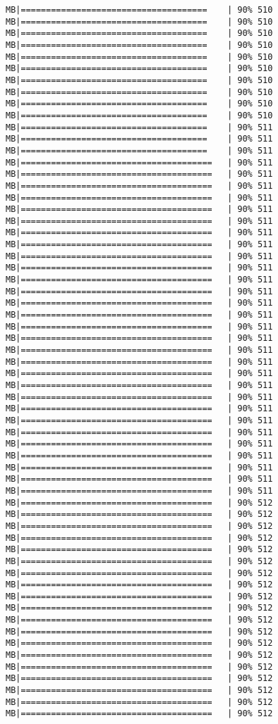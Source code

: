 \documentclass[
]{article}
\begin{document}
\begin{verbatim}
MB|=====================================    | 90% 510 MB|=====================================    | 90% 510 MB|=====================================    | 90% 510 MB|=====================================    | 90% 510 MB|=====================================    | 90% 510 MB|=====================================    | 90% 510 MB|=====================================    | 90% 510 MB|=====================================    | 90% 510 MB|=====================================    | 90% 510 MB|=====================================    | 90% 510 MB|=====================================    | 90% 511 MB|=====================================    | 90% 511 MB|=====================================    | 90% 511 MB|======================================   | 90% 511 MB|======================================   | 90% 511 MB|======================================   | 90% 511 MB|======================================   | 90% 511 MB|======================================   | 90% 511 MB|======================================   | 90% 511 MB|======================================   | 90% 511 MB|======================================   | 90% 511 MB|======================================   | 90% 511 MB|======================================   | 90% 511 MB|======================================   | 90% 511 MB|======================================   | 90% 511 MB|======================================   | 90% 511 MB|======================================   | 90% 511 MB|======================================   | 90% 511 MB|======================================   | 90% 511 MB|======================================   | 90% 511 MB|======================================   | 90% 511 MB|======================================   | 90% 511 MB|======================================   | 90% 511 MB|======================================   | 90% 511 MB|======================================   | 90% 511 MB|======================================   | 90% 511 MB|======================================   | 90% 511 MB|======================================   | 90% 511 MB|======================================   | 90% 511 MB|======================================   | 90% 511 MB|======================================   | 90% 511 MB|======================================   | 90% 511 MB|======================================   | 90% 512 MB|======================================   | 90% 512 MB|======================================   | 90% 512 MB|======================================   | 90% 512 MB|======================================   | 90% 512 MB|======================================   | 90% 512 MB|======================================   | 90% 512 MB|======================================   | 90% 512 MB|======================================   | 90% 512 MB|======================================   | 90% 512 MB|======================================   | 90% 512 MB|======================================   | 90% 512 MB|======================================   | 90% 512 MB|======================================   | 90% 512 MB|======================================   | 90% 512 MB|======================================   | 90% 512 MB|======================================   | 90% 512 MB|======================================   | 90% 512 MB|======================================   | 90% 512 
\end{verbatim}
\end{document}
